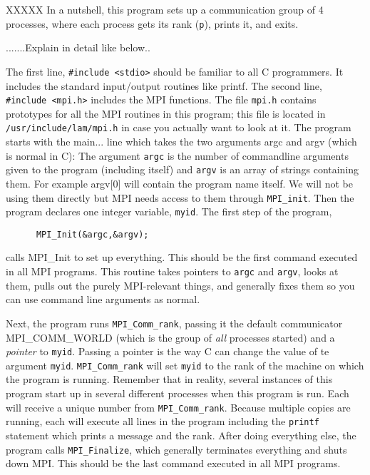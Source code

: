 \documentclass[12pt]{article}
\begin{document}
XXXXX
In a nutshell, this program sets up a communication group of 4 
processes, where each process gets its rank (\texttt{p}), prints it, 
and exits. 

.......Explain in detail like below..




The first line,
\texttt{\#include <stdio>}
should be familiar to all C programmers. It includes the standard
input/output routines like printf. The second line,
\texttt{\#include <mpi.h>}
includes the MPI functions. The file \texttt{mpi.h} 
contains prototypes for all the
MPI routines in this program; this file is located in
\texttt{/usr/include/lam/mpi.h} in case you actually want to look at it.
The program starts with the main... line which takes the two arguments
argc and argv (which is normal in C): The argument \texttt{argc} is
the number of commandline arguments given to the program (including itself)
and \texttt{argv} is an array of strings containing them. For example
argv[0] will contain the program name itself. We will not be using them 
directly but MPI needs access to them through \texttt{MPI\_init}.
Then the program declares one integer variable, \texttt{myid}. The
first step of the program,
\begin{verbatim} 
      MPI_Init(&argc,&argv);
\end{verbatim}       
calls MPI\_Init to set up everything. 
This should be the first command executed in all MPI programs. This
routine takes pointers to \texttt{argc} and \texttt{argv}, 
looks at them, pulls out the purely
MPI-relevant things, and generally fixes them so you can use command line
arguments as normal.

\medskip

Next, the program runs \texttt{MPI\_Comm\_rank}, 
passing it the default communicator MPI\_COMM\_WORLD 
(which is the group of \emph{all} processes started)
and a \emph{pointer} to \texttt{myid}. Passing a pointer is the way 
C can change the value of te argument \texttt{myid}.
\texttt{MPI\_Comm\_rank} will set \texttt{myid} to the rank of the machine 
on which the program is running. 
Remember that in reality, several instances of this program
start up in several different processes when this program is run. Each
will receive a unique number from \texttt{MPI\_Comm\_rank}.
Because multiple copies are running, each will execute all lines 
in the program including the \texttt{printf} statement which prints a 
message and the rank. 
After doing everything else, the program calls \texttt{MPI\_Finalize},
which generally terminates everything and shuts down MPI. This should be the
last command executed in all MPI programs.
\end{document}
